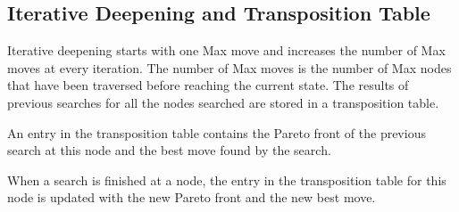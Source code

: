 \documentclass{ecai}
\begin{document}
\subsection{Iterative Deepening and Transposition Table}

Iterative deepening starts with one Max move and increases the number
of Max moves at every iteration. The number of Max moves is the number
of Max nodes that have been traversed before reaching the current
state. The results of previous searches for all the nodes searched are
stored in a transposition table.

An entry in the transposition table contains the Pareto front of the
previous search at this node and the best move found by the search.



When a search is finished at a node, the entry in the transposition
table for this node is updated with the new Pareto front and the new
best move.



\end{document}
